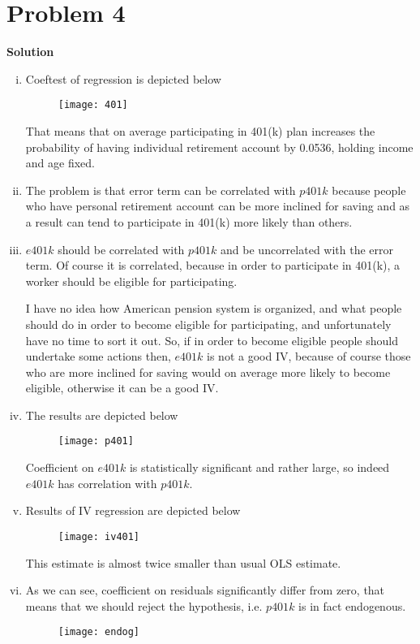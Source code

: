 \documentclass[a4paper]{article}
\begin{document}
\section*{Problem 4}

\textbf{Solution}

\begin{enumerate}[(i)]
	\item Coeftest of regression is depicted below
	\begin{figure}[H]
		\centering
		\texttt{[image: 401]}
		\caption{}\label{fig5}
	\end{figure}
That means that on average participating in 401(k) plan increases the probability of having individual retirement account by 0.0536, holding income and age fixed.
\item The problem is that error term can be correlated with $p401k$ because people who have personal retirement account can be more inclined for saving and as a result can tend to participate in 401(k) more likely than others.
\item  $e401k$ should be correlated with $p401k$ and be uncorrelated with the error term. Of course it is correlated, because in order to participate in 401(k), a worker should be eligible for participating.

I have no idea how American pension system is organized, and what people should do in order to become eligible for participating, and unfortunately have no time to sort it out. So, if in order to become eligible people should undertake some actions then, $e401k$ is not a good IV, because of course those who are more inclined for saving would on average more likely to become eligible, otherwise it can be a good IV.
\item 	
The results are depicted below
\begin{figure}[H]
	\centering
	\texttt{[image: p401]}
	\caption{}\label{fig6}
\end{figure}
Coefficient on $e401k$ is statistically significant and rather large, so indeed $e401k$ has correlation with $p401k$.
\item Results of IV regression are depicted below
\begin{figure}[H]
	\centering
	\texttt{[image: iv401]}
	\caption{}\label{fig7}
\end{figure}
This estimate is almost twice smaller than usual OLS estimate.
\item As we can see, coefficient on residuals significantly differ from zero, that means that we should reject the hypothesis, i.e. $p401k$ is in fact endogenous.
\begin{figure}[H]
	\centering
	\texttt{[image: endog]}
	\caption{}\label{fig8}
\end{figure}
\end{enumerate}
\end{document}
